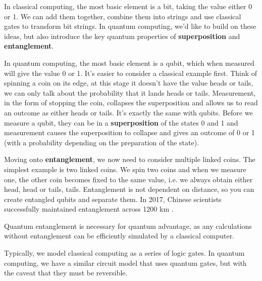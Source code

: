 \documentclass{article}
\theoremstyle{definition}
\begin{document}
In classical computing, the most basic element is a bit, taking the value either 0 or 1. We can add them together, combine them into strings and use classical gates to transform bit strings. In quantum computing, we'd like to build on these ideas, but also introduce the key quantum properties of \textbf{superposition} and \textbf{entanglement}.

In quantum computing, the most basic element is a qubit, which when measured will give the value 0 or 1. It's easier to consider a classical example first. Think of spinning a coin on its edge, at this stage it doesn't have the value heads or tails, we can only talk about the probability that it lands heads or tails. Measurement, in the form of stopping the coin, collapses the superposition and allows us to read an outcome as either heads or tails. It's exactly the same with qubits. Before we measure a qubit, they can be in a \textbf{superposition} of the states 0 and 1 and measurement causes the superposition to collapse and gives an outcome of 0 or 1 (with a probability depending on the preparation of the state).

Moving onto \textbf{entanglement}, we now need to consider multiple linked coins. The simplest example is two linked coins. We spin two coins and when we measure one, the other coin becomes fixed to the same value, i.e. we always obtain either head, head or tails, tails. Entanglement is not dependent on distance, so you can create entangled qubits and separate them. In 2017, Chinese scientists successfully maintained entanglement across 1200 km \cite{Yin1140}. 

Quantum entanglement is necessary for quantum advantage, as any calculations without entanglement can be efficiently simulated by a classical computer. 

Typically, we model classical computing as a series of logic gates. In quantum computing, we have a similar circuit model that uses quantum gates, but with the caveat that they must be reversible. 
\end{document}
